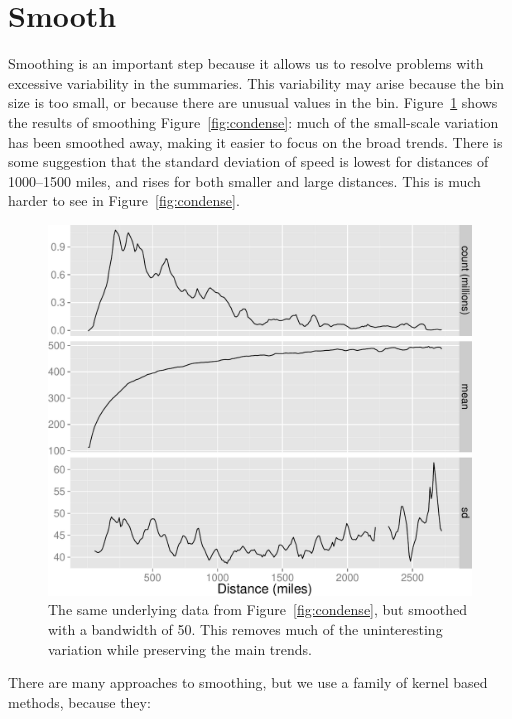 \documentclass[journal]{vgtc}                %
\begin{document}
\section{Smooth}
\label{sec:smooth}

Smoothing is an important step because it allows us to resolve problems with excessive variability in the summaries. This variability may arise because the bin size is too small, or because there are unusual values in the bin. Figure~\ref{fig:smooth} shows the results of smoothing Figure~\ref{fig:condense}: much of the small-scale variation has been smoothed away, making it easier to focus on the broad trends. There is some suggestion that the standard deviation of speed is lowest for distances of 1000--1500 miles, and rises for both smaller and large distances. This is much harder to see in Figure~\ref{fig:condense}.

\begin{figure}[htb]
 \centering
 \includegraphics[width=\linewidth]{smooth}
 \caption{The same underlying data from Figure~\ref{fig:condense}, but smoothed with a bandwidth of 50. This removes much of the uninteresting variation while preserving the main trends.}
 \label{fig:smooth}
\end{figure}

There are many approaches to smoothing, but we use a family of kernel based methods, because they:
\end{document}
